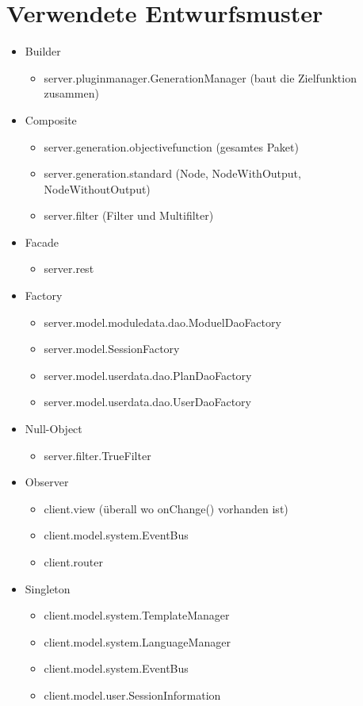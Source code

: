 \section{Verwendete Entwurfsmuster}
\begin{itemize}
	\item Builder
		\begin{itemize}
			\item server.pluginmanager.GenerationManager (baut die Zielfunktion zusammen)
		\end{itemize}
		
	\item Composite
		\begin{itemize}
			\item server.generation.objectivefunction (gesamtes Paket)
			\item server.generation.standard (Node, NodeWithOutput, NodeWithoutOutput)
			\item server.filter (Filter und Multifilter)
		\end{itemize}
		
	\item Facade
		\begin{itemize}
			\item server.rest
		\end{itemize}
	\item Factory
		\begin{itemize}
			\item server.model.moduledata.dao.ModuelDaoFactory
			\item server.model.SessionFactory
			\item server.model.userdata.dao.PlanDaoFactory
			\item server.model.userdata.dao.UserDaoFactory
		\end{itemize}	
	\item Null-Object
		\begin{itemize}
			\item server.filter.TrueFilter
		\end{itemize}
		
	\item Observer
		\begin{itemize}
			\item client.view (überall wo onChange() vorhanden ist)
			\item client.model.system.EventBus
			\item client.router
		\end{itemize}
	
	\item Singleton
		\begin{itemize}
			\item client.model.system.TemplateManager
			\item client.model.system.LanguageManager
			\item client.model.system.EventBus
			\item client.model.user.SessionInformation
		\end{itemize}
	

\end{itemize}
